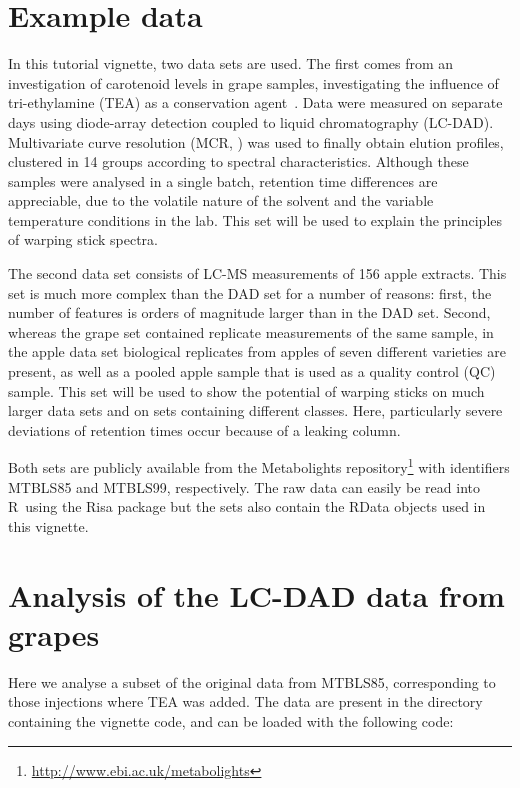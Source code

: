 \documentclass[a4paper,11pt]{article}\usepackage[]{graphicx}\usepackage[]{color}
\newcommand{\pkg}[1]{{\normalfont\fontseries{b}\selectfont #1}}
\newcommand{\proglang}[1]{{\sffamily #1}}
\newcommand{\R}{\proglang{R}}
\begin{document}
\section{Example data}
In this tutorial vignette, two data sets are used. The first comes
from an investigation of carotenoid levels in grape samples,
investigating the influence of tri-ethylamine (TEA) as a conservation
agent~\citep{Wehrens2015}. Data were measured on separate days using
diode-array detection coupled to liquid chromatography
(LC-DAD). Multivariate curve resolution (MCR, \citet{Juan2006}) was
used to finally obtain elution profiles, clustered in 14 groups according to
spectral characteristics. Although these samples were analysed in a
single batch, retention time differences are appreciable, due to the
volatile nature of the solvent and the variable temperature conditions
in the lab. This set will be used to explain the principles of warping
stick spectra.

The second data set consists of LC-MS measurements of 156 apple
extracts. This set is much more complex than the DAD set for a number
of reasons: first, the number of features is orders of magnitude
larger than in the DAD set. Second, whereas the grape set contained
replicate measurements of the same sample, in the apple data set
biological replicates from apples of seven different varieties are
present, as well as a pooled apple sample that is used as a quality
control (QC) sample. This set will be used to show the potential of warping
sticks on much larger data sets and on sets containing different classes.
Here, particularly severe deviations of retention times
occur because of a leaking column. 



Both sets are publicly available from the Metabolights 
repository\footnote{\url{http://www.ebi.ac.uk/metabolights}} with
identifiers MTBLS85 and MTBLS99, respectively. The raw data can easily
be read into \R\ using the \pkg{Risa} package \citep{Gonzalez2014} but
the sets also contain the RData objects used in this vignette.


\section{Analysis of the LC-DAD data from grapes}
Here we analyse a subset of the original data from MTBLS85,
corresponding to those injections where TEA was added. The data are
present in the directory containing the vignette code, and can be
loaded with the following code:
\end{document}
